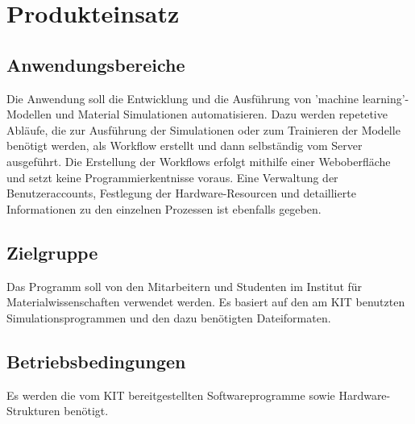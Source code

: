 \section{Produkteinsatz}
\subsection{Anwendungsbereiche}
    \begin{itemize}
    Die Anwendung soll die Entwicklung und die Ausführung von 'machine learning'-Modellen und Material Simulationen automatisieren. Dazu werden repetetive Abläufe, die zur Ausführung der Simulationen oder zum Trainieren der Modelle benötigt werden, als Workflow erstellt und dann selbständig vom Server ausgeführt. Die Erstellung der Workflows erfolgt mithilfe einer Weboberfläche und setzt keine Programmierkentnisse voraus. Eine Verwaltung der Benutzeraccounts, Festlegung der Hardware-Resourcen und detaillierte Informationen zu den einzelnen Prozessen ist ebenfalls gegeben.
    \end{itemize}
\subsection{Zielgruppe}
    \begin{itemize}
    Das Programm soll von den Mitarbeitern und Studenten im Institut für Materialwissenschaften verwendet werden. Es basiert auf den am KIT benutzten Simulationsprogrammen und den dazu benötigten Dateiformaten. 
    \end{itemize}
\subsection{Betriebsbedingungen}
    \begin{itemize}
    Es werden die vom KIT bereitgestellten Softwareprogramme sowie Hardware-Strukturen benötigt.
    \end{itemize}
\newpage